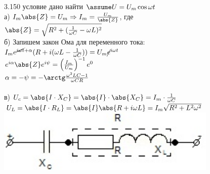 \testCom
{%
	3.150
}
{%
	условие
}
{%
	дано
}
{%
	найти
}
{%
	$\assume U = U_m \cos \omega t$\\
	а) $I_m \abs{Z} = U_m \Rightarrow I_m = \frac{U_m}{\abs{Z}}$, где\\
	$\abs{Z} = \sqrt{R^2 + (\frac{1}{\omega C } - \omega L)^2}$\\
	б) Запишем закон Ома для переменного тока:
	$I_m e^{\cancel{i \omega t} + \alpha} (R + i(\omega L - \frac{1}{\omega C})) = U_m \cancel e^{i \omega t}$\\
	$e^{i \alpha} \abs{Z} e^{i \psi} = \left( \frac{I_m}{U_m}\right)^{-1} e^0$\\
	$\alpha = - \psi = - \arctg \frac{\omega^2 L C - 1}{\omega C R}$\\\\
	в) $U_c = \abs{I \cdot X_C} = \abs{I} \cdot \abs{X_C} = I_m \cdot \frac{1}{\omega C}$\\
	$U_L = \abs{I \cdot R_L} = \abs{I} \abs{R + i \omega L} = I_m \sqrt{R^2 + L^2 \omega^2}$\\
	\includegraphics[height=30mm]{3_150.jpg}\\
}

